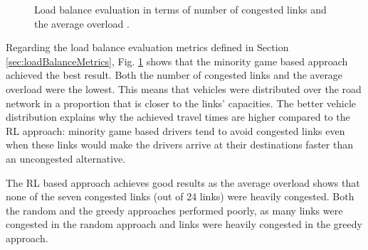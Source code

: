 \documentclass{RITA}
\begin{document}
\begin{figure}[ht]
  \centering
  \caption{Load balance evaluation in terms of number of congested links  and the average overload .}
  \label{fig:loadBalance}
\end{figure}

Regarding the load balance evaluation metrics defined in Section \ref{sec:loadBalanceMetrics}, Fig. \ref{fig:loadBalance} shows that the minority game based approach achieved the best result. Both the number of congested links and the average overload were the lowest. This means that vehicles were distributed over the road network in a proportion that is closer to the links' capacities. The better vehicle distribution explains why the achieved travel times are higher compared to the RL approach: minority game based drivers tend to avoid congested links even when these links would make the drivers arrive at their destinations faster than an uncongested alternative. 

The RL based approach achieves good results as the average overload shows that none of the seven congested links (out of 24 links) were heavily congested. Both the random and the greedy approaches performed poorly, as many links were congested in the random approach and links were heavily congested in the greedy approach.
\end{document}
